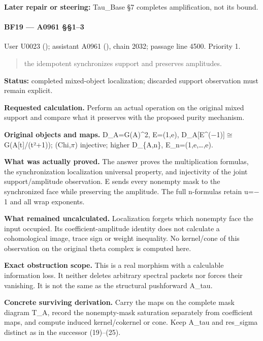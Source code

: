\textbf{Later repair or steering:} Tau\_Base §7 completes amplification,
not its bound.

\paragraph{BF19 --- A0961 §§1--3}\label{bf19-a0961-13}

User U0023 (\protect{});
assistant A0961 (\protect{}),
chain 2032; passage line 4500. Priority 1.

\begin{quote}
the idempotent synchronizes support and preserves amplitudes.
\end{quote}

\textbf{Status:} completed mixed-object localization; discarded support
observation must remain explicit.

\textbf{Requested calculation.} Perform an actual operation on the
original mixed support and compare what it preserves with the proposed
purity mechanism.

\textbf{Original objects and maps.} D\_A=G(A)\^{}2, E=(1,e),
D\_A[E\textasciicircum{}(\allowbreak{}\ensuremath{−}\allowbreak{}1)]\allowbreak{}\ensuremath{≅}\allowbreak{}G(A[t]/(t²+1));
(Chi,\allowbreak{}\ensuremath{π}\allowbreak{}) injective; higher
D\_\{A,n\}, E\_n=(1,e,\ldots,e).

\textbf{What was actually proved.} The answer proves the multiplication
formulas, the synchronization localization universal property, and
injectivity of the joint support/amplitude observation. E sends every
nonempty mask to the synchronized face while preserving the amplitude.
The full n-formulas retain u=\allowbreak{}\ensuremath{−}\allowbreak{}1
and all wrap exponents.

\textbf{What remained uncalculated.} Localization forgets which nonempty
face the input occupied. Its coefficient-amplitude identity does not
calculate a cohomological image, trace sign or weight inequality. No
kernel/cone of this observation on the original theta complex is
computed here.

\textbf{Exact obstruction scope.} This is a real morphism with a
calculable information loss. It neither deletes arbitrary spectral
packets nor forces their vanishing. It is not the same as the structural
pushforward A\_tau.

\textbf{Concrete surviving derivation.} Carry the maps on the complete
mask diagram T\_A, record the nonempty-mask saturation separately from
coefficient maps, and compute induced kernel/cokernel or cone. Keep
A\_tau and res\_sigma distinct as in the successor (19)--(25).


